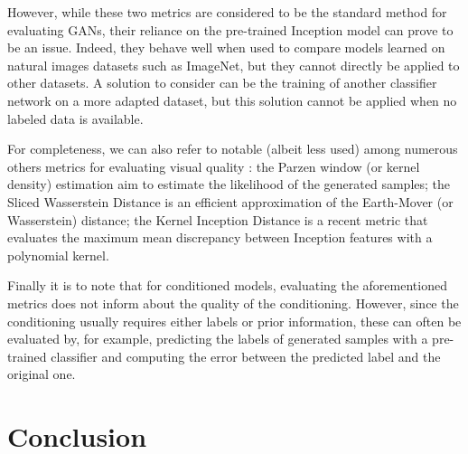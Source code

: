 However, while these two metrics are considered to be the standard method for evaluating \ac{GAN}s, their reliance on the pre-trained Inception model can prove to be an issue. Indeed, they behave well when used to compare models learned on natural images datasets such as ImageNet, but they cannot directly be applied to other datasets. A solution to consider can be the training of another classifier network on a more adapted dataset, but this solution cannot be applied when no labeled data is available.

For completeness, we can also refer to notable (albeit less used) among numerous others metrics for evaluating visual quality  \citep{Borji2018}: the Parzen window (or kernel density) estimation \citep{Parzen1962} aim to estimate the likelihood of the generated samples; the Sliced Wasserstein Distance \citep{Julien2011} is an efficient approximation of the Earth-Mover (or Wasserstein) distance; the  Kernel Inception Distance \citep{Binkowski2018} is a recent metric that evaluates the maximum mean discrepancy between Inception features with a polynomial kernel.

Finally it is to note that for conditioned models, evaluating the aforementioned metrics does not inform about the quality of the conditioning. However, since the conditioning usually requires either labels or prior information, these can often be evaluated by, for example, predicting the labels of generated samples with a pre-trained classifier and computing the error between the predicted label and the original one.


\section{Conclusion}



